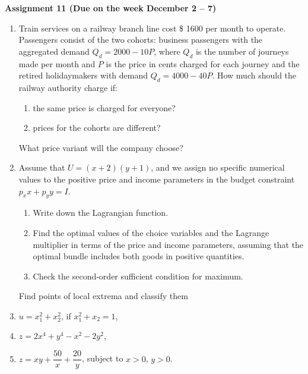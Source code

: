 \documentclass{article}
\begin{document}
\fontsize{14}{21}
\selectfont
\centerline{\textbf{Assignment 11 (Due on the week December 2 -- 7)}}
\fontsize{12}{18}
\selectfont
\begin{enumerate}
\item Train	services on a railway branch line cost \$ 1600 per month to operate. Passengers consist of the two cohorts: business passengers with the aggregated demand $Q_d=2000-10P$, where $Q_d$ is the number of journeys made per month and $P$ is the price in cents charged for each journey and the retired holidaymakers with demand $Q_d=4000-40P$. How much should	the railway authority charge if:
    \begin{enumerate}
    \item the same price is charged for everyone?
    \item prices for the cohorts are different?
    \end{enumerate}
What price variant will the company choose?
\item Assume that $U=(x+2)(y+1)$, and we assign no specific numerical values to the positive price and income parameters in the budget constraint $p_xx+p_yy=I$.
    \begin{enumerate}
    \item Write down the Lagrangian function.
    \item Find the optimal values of the choice variables and the Lagrange multiplier in terms of the price and income parameters, assuming that the optimal bundle includes both goods in positive quantities.
    \item Check the second-order sufficient condition for maximum.
    \end{enumerate}
\medskip

Find points of local extrema and classify them
\item $u=x_1^2+x_2^2$, if $x_1^2+x_2=1$,
\item $z=2x^4+y^4-x^2-2y^2$,
\item $z=xy+\dfrac{50}x+\dfrac{20}y$, subject to $x>0$, $y>0$.
\end{enumerate}
\end{document}
